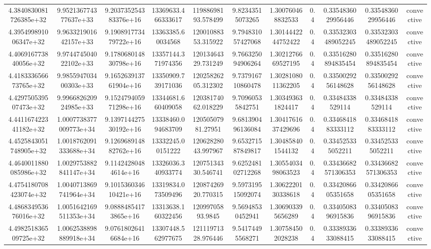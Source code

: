 \begin{table}
\begin{tabular}{ccccccccccc}
4.3840830081726385e+32 & 9.952136774377637e+33 & 9.203735254383376e+16 & 13369633.466333617 & 11988698193.578499 & 9.82343515073265 & 1.300760468832533 & 0.4 & 0.3354836029956446 & 0.3354836029956446 & convective \\
4.395499891006347e+32 & 9.963321901642157e+33 & 9.190891773479722e+16 & 13363385.60034568 & 12001088353.315922 & 9.794831057427068 & 1.3014442244752422 & 0.4 & 0.33532303489052245 & 0.33532303489052245 & convective \\
4.406916773840056e+32 & 9.974474504022102e+33 & 9.178068014830798e+16 & 13357144.371974356 & 12013464329.731249 & 9.766325094906264 & 1.3021276669527195 & 0.4 & 0.33516280894835454 & 0.33516280894835454 & convective \\
4.418333656673765e+32 & 9.985594703400303e+33 & 9.165263913761904e+16 & 13350909.739171036 & 12025826205.312302 & 9.737916710860478 & 1.3028108011362205 & 0.4 & 0.3350029256148628 & 0.3350029256148628 & convective \\
4.429750539507473e+32 & 9.996682620924985e+33 & 9.152479405971298e+16 & 13344681.660409058 & 12038174062.018229 & 9.70960535842751 & 1.303493631824417 & 0.4 & 0.33484338529114 & 0.33484338529114 & convective \\
4.441167422341182e+32 & 1.0007738377009773e+34 & 9.139714427530192e+16 & 13338460.094683709 & 12050507981.27951 & 9.681390496136084 & 1.3041761637429696 & 0.4 & 0.3346841883333112 & 0.3346841883333112 & convective \\
4.4525843051748905e+32 & 1.0018762091333688e+34 & 9.126968914882762e+16 & 13332245.00151222 & 12062828043.997967 & 9.653271587849817 & 1.304858401544132 & 0.4 & 0.334525335052211 & 0.334525335052211 & convective \\
4.4640011880085986e+32 & 1.0029753882841147e+34 & 9.11424280484614e+16 & 13326036.340933774 & 12075134330.546741 & 9.625248102712268 & 1.3055403498063523 & 0.4 & 0.33436682571306353 & 0.33436682571306353 & convective \\
4.4754180708423074e+32 & 1.0040713869741964e+34 & 9.101536034610421e+16 & 13319834.073509496 & 12087426920.770315 & 9.597319515092074 & 1.3062220130338618 & 0.4 & 0.3342086605351658 & 0.3342086605351658 & convective \\
4.486834953676016e+32 & 1.0051642169511353e+34 & 9.08884854173865e+16 & 13313638.160322456 & 12099705893.9845 & 9.56948530452941 & 1.306903395656289 & 0.4 & 0.3340508396915836 & 0.3340508396915836 & convective \\
4.498251836509725e+32 & 1.0062538898889918e+34 & 9.07618026416684e+16 & 13307448.562977675 & 12111971328.976446 & 9.54174495568271 & 1.307584502028238 & 0.4 & 0.3338933633088415 & 0.3338933633088415 & convective \\

\end{tabular}
\end{table}
